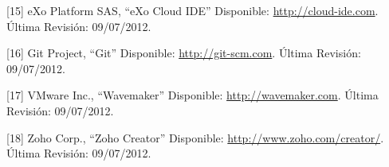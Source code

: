 \documentclass[12pt,titlepage,]{article}
\begin{document}
{[}15{]} eXo Platform SAS, ``eXo Cloud IDE'' Disponible:
\href{http://cloud-ide.com}{http://cloud-ide.com}. Última Revisión:
09/07/2012.

{[}16{]} Git Project, ``Git'' Disponible:
\href{http://git-scm.com}{http://git-scm.com}. Última Revisión:
09/07/2012.

{[}17{]} VMware Inc., ``Wavemaker'' Disponible:
\href{http://wavemaker.com}{http://wavemaker.com}. Última Revisión:
09/07/2012.

{[}18{]} Zoho Corp., ``Zoho Creator'' Disponible:
\href{http://www.zoho.com/creator/}{http://www.zoho.com/creator/}.
Última Revisión: 09/07/2012.
\end{document}
